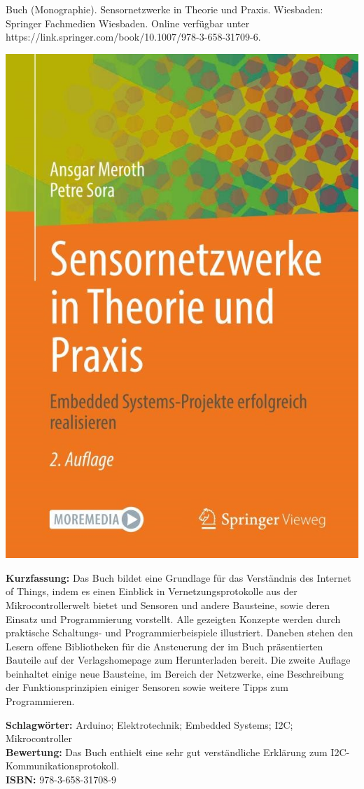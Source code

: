 {
Buch (Monographie). Sensornetzwerke in Theorie und Praxis.
Wiesbaden: Springer Fachmedien Wiesbaden. Online verfügbar unter https://link.springer.com/book/10.1007/978-3-658-31709-6.
 \\
\begin{minipage}{0.38\textwidth}
	\includegraphics[width=\linewidth]{images/Meroth.jpg}
\end{minipage}
\hfill
\begin{minipage}{0.6\textwidth}
\textbf{Kurzfassung:}
Das Buch bildet eine  Grundlage für das Verständnis des Internet of Things, indem es einen Einblick in Vernetzungsprotokolle aus der Mikrocontrollerwelt bietet und Sensoren und andere Bausteine, sowie deren Einsatz und Programmierung vorstellt. Alle gezeigten Konzepte werden durch praktische Schaltungs- und Programmierbeispiele illustriert. Daneben stehen den Lesern offene Bibliotheken für die Ansteuerung der im Buch präsentierten Bauteile auf der Verlagshomepage zum Herunterladen bereit. Die zweite Auflage beinhaltet einige neue Bausteine, im Bereich der Netzwerke, eine Beschreibung der Funktionsprinzipien einiger Sensoren sowie weitere Tipps zum Programmieren.
\end{minipage}
\textbf{Schlagwörter:}
Arduino; Elektrotechnik; Embedded Systems; I2C; Mikrocontroller
\\ \textbf{Bewertung:}
Das Buch enthielt eine sehr gut verständliche Erklärung zum I2C-Kommunikationsprotokoll.
\\ \textbf{ISBN:}
978-3-658-31708-9
}

